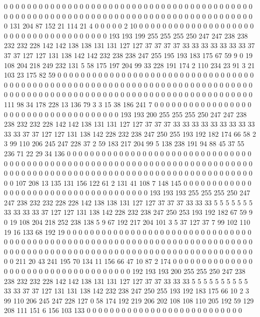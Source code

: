 0 0 0 0 0 0 0 0 0 0 0 0 0 0 0 0 0 0 0 0
0 0 0 0 0 0 0 0 0 0 0 0 0 0 0 0 0 0 0 0
0 0 0 0 0 0 0 0 0 0 0 0 0 0 0 0 0 0 0 0
0 0 0 0 0 0 0 0 0 0 0 0 0 0 0 0 0 0 0 0
0 0 0 0 0 0 0 131 204 87 152 21 114 21 4 0 0 0 0 0
2 10 0 0 0 0 0 0 0 0 0 0 0 0 0 0 0 0 0 0
0 0 0 0 0 0 0 0 0 0 0 0 0 0 0 0 0 0 0 0
193 193 199 255 255 255 250 247 247 238 238 232 232 228 142 142 138 138 131 131
127 127 37 37 37 37 33 33 33 33 33 33 33 37 37 37 127 127 131 138
142 142 232 238 238 247 255 195 193 183 175 67 59 9 0 19 108 204 218 249
232 131 5 58 175 197 204 99 33 228 191 174 2 110 234 23 91 3 21 103
23 175 82 59 0 0 0 0 0 0 0 0 0 0 0 0 0 0 0 0
0 0 0 0 0 0 0 0 0 0 0 0 0 0 0 0 0 0 0 0
0 0 0 0 0 0 0 0 0 0 0 0 0 0 0 0 0 0 0 0
0 0 0 0 0 0 0 0 0 0 0 0 0 0 0 0 0 0 0 0
0 0 0 0 0 0 0 0 0 0 0 0 0 0 0 0 0 0 0 0
0 0 0 0 0 0 0 0 0 0 0 0 0 0 0 0 0 0 0 0
0 0 0 0 111 98 34 178 228 13 136 79 3 3 15 38 186 241 7 0
0 0 0 0 0 0 0 0 0 0 0 0 0 0 0 0 0 0 0 0
0 0 0 0 0 0 0 0 0 0 0 0 0 0 0 0 193 193 200 255
255 255 250 247 247 238 238 232 232 228 142 142 138 131 131 127 127 37 37 37
33 33 33 33 33 33 33 33 33 33 33 37 37 127 127 131 138 142 228 232
238 247 250 255 193 192 182 174 66 58 2 3 99 110 206 245 247 228 37 2
59 183 217 204 99 5 138 238 191 94 88 45 37 55 236 71 22 29 34 136
0 0 0 0 0 0 0 0 0 0 0 0 0 0 0 0 0 0 0 0
0 0 0 0 0 0 0 0 0 0 0 0 0 0 0 0 0 0 0 0
0 0 0 0 0 0 0 0 0 0 0 0 0 0 0 0 0 0 0 0
0 0 0 0 0 0 0 0 0 0 0 0 0 0 0 0 0 0 0 0
0 0 0 0 0 0 0 0 0 0 0 0 0 0 0 0 0 0 0 0
0 0 0 0 0 0 0 0 0 0 0 0 0 0 0 0 0 0 0 0
107 208 13 135 131 156 122 61 2 131 41 108 7 148 145 0 0 0 0 0
0 0 0 0 0 0 0 0 0 0 0 0 0 0 0 0 0 0 0 0
0 0 0 0 0 0 0 0 0 0 0 0 193 193 193 255 255 255 250 247
247 238 232 232 228 228 142 138 138 131 127 127 37 37 37 33 33 33 5 5
5 5 5 5 5 33 33 33 33 37 127 127 131 138 142 228 232 238 247 250
253 193 192 182 67 59 9 0 19 108 204 218 252 238 138 5 9 67 192 217
204 101 3 5 37 127 37 7 99 102 110 19 16 133 68 192 19 0 0 0
0 0 0 0 0 0 0 0 0 0 0 0 0 0 0 0 0 0 0 0
0 0 0 0 0 0 0 0 0 0 0 0 0 0 0 0 0 0 0 0
0 0 0 0 0 0 0 0 0 0 0 0 0 0 0 0 0 0 0 0
0 0 0 0 0 0 0 0 0 0 0 0 0 0 0 0 0 0 0 0
0 0 0 0 0 0 0 0 0 0 0 0 0 0 0 0 0 0 0 0
0 0 0 0 0 0 0 0 0 0 0 0 0 0 0 0 0 211 20 43
241 195 70 134 11 156 66 47 10 87 2 174 0 0 0 0 0 0 0 0
0 0 0 0 0 0 0 0 0 0 0 0 0 0 0 0 0 0 0 0
0 0 0 0 0 0 0 0 192 193 193 200 255 255 250 247 238 238 232 232
228 142 142 138 131 131 127 127 37 37 33 33 33 5 5 5 5 5 5 5
5 5 5 33 33 37 37 127 131 131 138 142 232 238 247 250 255 193 192 183
175 66 10 2 3 99 110 206 245 247 228 127 0 58 174 192 219 206 202 108
108 110 205 192 59 129 208 111 151 6 156 103 133 0 0 0 0 0 0 0
0 0 0 0 0 0 0 0 0 0 0 0 0 0 0 0 0 0 0 0
